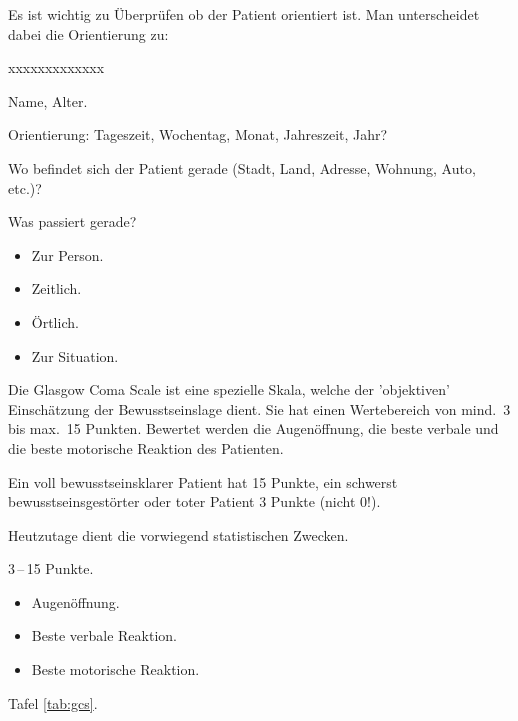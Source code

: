 {
\label{topic:orientierung}

Es ist wichtig zu Überprüfen ob der Patient orientiert ist.
Man unterscheidet dabei die Orientierung zu:  

\begin{labeling}[~--]{xxxxxxxxxxxxx}
  \item[Person] Name, Alter.
  \item[Zeit] Orientierung: Tageszeit,
  Wochentag, Monat, Jahreszeit, Jahr?
  \item[Ort] Wo befindet sich der Patient gerade (Stadt, Land, Adresse, Wohnung, Auto, etc.)?
  \item[Situation] Was passiert gerade?
\end{labeling}

}{
\begin{itemize}
    \item Zur Person. 
    \item Zeitlich. 
    \item Örtlich. 
    \item Zur Situation. 
\end{itemize}
}{}{}{}

{
\label{topic:gcs}

Die Glasgow Coma Scale ist eine spezielle Skala, welche der 'objektiven'
Einschätzung der Bewusstseinslage  dient. Sie hat einen Wertebereich von mind.~3
bis max.~15 Punkten. Bewertet werden die Augenöffnung, die beste verbale und
die beste motorische Reaktion des Patienten. 

Ein voll bewusstseinsklarer Patient hat 15 Punkte, ein schwerst
bewusstseinsgestörter oder toter Patient 3 Punkte (nicht 0!).

Heutzutage dient die  vorwiegend statistischen
Zwecken.
}{
3\,--\,15 Punkte.
\begin{itemize}
    \item Augenöffnung.
    \item Beste verbale Reaktion.
    \item Beste motorische Reaktion.
\end{itemize}
Tafel \ref{tab:gcs}.
}{}{}{}



